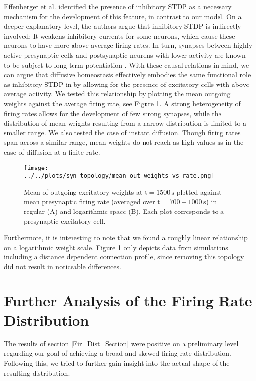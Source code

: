\documentclass[10pt,a4paper]{article}
\begin{document}
Effenberger et al. identified the presence of inhibitory STDP as a necessary mechanism for the development of this feature, in contrast to our model. On a deeper explanatory level, the authors argue that inhibitory STDP is indirectly involved: It weakens inhibitory currents for some neurons, which cause these neurons to have more above-average firing rates. In turn, synapses between highly active presynaptic cells and postsynaptic neurons with lower activity are known to be subject to long-term potentiation \cite{Sjoestroem_Syn_Plasticity_2001,Feldman_STDP_2012}. With these causal relations in mind, we can argue that diffusive homeostasis effectively embodies the same functional role as inhibitory STDP in \cite{Effenberger_2015} by allowing for the presence of excitatory cells with above-average activity. We tested this relationship by plotting the mean outgoing weights against the average firing rate, see Figure \ref{Out_Weight_vs_F}. A strong heterogeneity of firing rates allows for the development of few strong synapses, while the distribution of mean weights resulting from a narrow distribution is limited to a smaller range. We also tested the case of instant diffusion. Though firing rates span across a similar range, mean weights do not reach as high values as in the case of diffusion at a finite rate.
\begin{figure}
\texttt{[image: ../../plots/syn\_topology/mean\_out\_weights\_vs\_rate.png]}
\caption{Mean of outgoing excitatory weights at $\mathrm{t=1500\,s}$ plotted against mean presynaptic firing rate (averaged over $\mathrm{t=700-1000\,s}$) in regular (A) and logarithmic space (B). Each plot corresponds to a presynaptic excitatory cell.}
\label{Out_Weight_vs_F}
\end{figure}
Furthermore, it is interesting to note that we found a roughly linear relationship on a logarithmic weight scale. Figure \ref{Out_Weight_vs_F} only depicts data from simulations including a distance dependent connection profile, since removing this topology did not result in noticeable differences.
\newpage
\section{Further Analysis of the Firing Rate Distribution}
The results of section \ref{Fir_Dist_Section} were positive on a preliminary level regarding our goal of achieving a broad and skewed firing rate distribution. Following this, we tried to further gain insight into the actual shape of the resulting distribution. 
\end{document}
